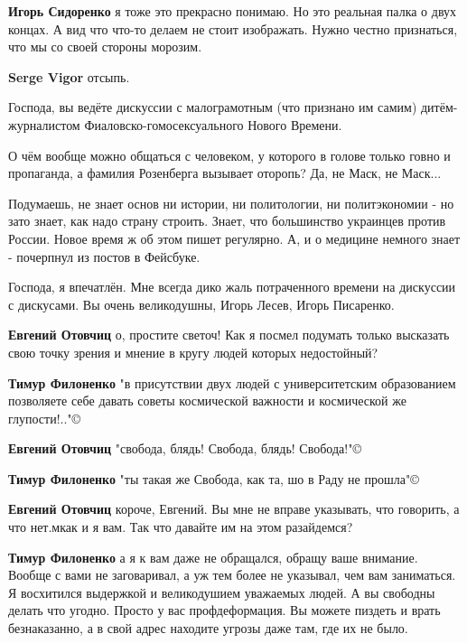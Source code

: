 \begin{itemize}
\begin{itemize}
\textbf{Игорь Сидоренко} я тоже это прекрасно понимаю. Но это реальная палка о двух концах. А вид что что-то делаем не стоит изображать. Нужно честно признаться, что мы со своей стороны морозим.

\textbf{Serge Vigor} отсыпь.


Господа, вы ведёте дискуссии с малограмотным (что признано им самим)
дитём-журналистом Фиаловско-гомосексуального Нового Времени.

О чём вообще можно общаться с человеком, у которого в голове только говно и
пропаганда, а фамилия Розенберга вызывает оторопь? Да, не Маск, не Маск...

Подумаешь, не знает основ ни истории, ни политологии, ни политэкономии - но
зато знает, как надо страну строить. Знает, что большинство украинцев против
России. Новое время ж об этом пишет регулярно. А, и о медицине немного знает -
почерпнул из постов в Фейсбуке.

Господа, я впечатлён. Мне всегда дико жаль потраченного времени на дискуссии с
дискусами. Вы очень великодушны, Игорь Лесев, Игорь Писаренко.


\textbf{Евгений Отовчиц} о, простите светоч! Как я посмел подумать только высказать свою точку зрения и мнение в кругу людей которых недостойный?

\textbf{Тимур Филоненко} "в присутствии двух людей с университетским образованием позволяете себе давать советы космической важности и космической же глупости!.."©

\textbf{Евгений Отовчиц} "свобода, блядь! Свобода, блядь! Свобода!"©

\textbf{Тимур Филоненко} "ты такая же Свобода, как та, шо в Раду не прошла"©

\textbf{Евгений Отовчиц} короче, Евгений. Вы мне не вправе указывать, что говорить, а что нет.мкак и я вам. Так что давайте им на этом разайдемся?

\textbf{Тимур Филоненко} а я к вам даже не обращался, обращу ваше внимание. Вообще с вами не заговаривал, а уж тем более не указывал, чем вам заниматься.
Я восхитился выдержкой и великодушием уважаемых людей.
А вы свободны делать что угодно. Просто у вас профдеформация. Вы можете пиздеть и врать безнаказанно, а в свой адрес находите угрозы даже там, где их не было.


\end{itemize}
\end{itemize}

